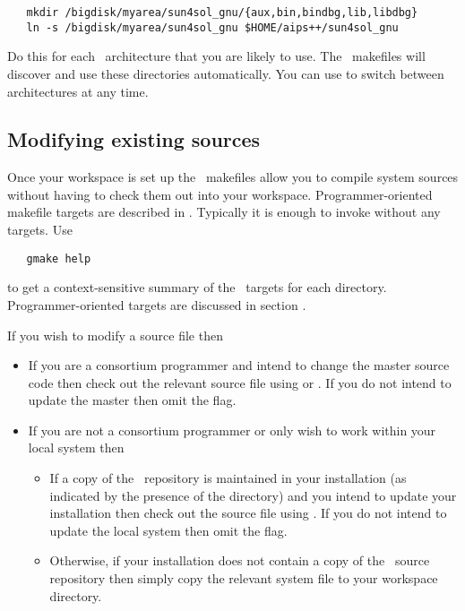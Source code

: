 \begin{verbatim}
   mkdir /bigdisk/myarea/sun4sol_gnu/{aux,bin,bindbg,lib,libdbg}
   ln -s /bigdisk/myarea/sun4sol_gnu $HOME/aips++/sun4sol_gnu
\end{verbatim}

\noindent
Do this for each \aipspp\ architecture that you are likely to use.  The
\aipspp\ makefiles will discover and use these directories automatically.  You
can use  to switch between architectures at any time.

\subsection*{Modifying existing sources}

Once your workspace is set up the \aipspp\ makefiles allow you to compile
system sources without having to check them out into your workspace.
Programmer-oriented makefile targets are described in .  Typically it is enough to invoke  without
any targets.  Use

\begin{verbatim}
   gmake help
\end{verbatim}

\noindent
to get a context-sensitive summary of the \aipspp\ targets for each directory.
Programmer-oriented targets are discussed in section .

If you wish to modify a source file then

\begin{itemize}
\item
   If you are a consortium programmer and intend to change the master source
   code then check out the relevant source file using  or
   .  If you do not intend to update the master then
   omit the  flag.

\item
   If you are not a consortium programmer or only wish to work within your
   local system then
   \begin{itemize}
   \item
      If a copy of the \rcs\ repository is maintained in your installation (as
      indicated by the presence of the  directory) and
      you intend to update your installation then check out the source file
      using .  If you do not intend to update the local system
      then omit the  flag.

   \item
      Otherwise, if your installation does not contain a copy of the \rcs\
      source repository then simply copy the relevant system file to your
      workspace directory.
   \end{itemize}
\end{itemize}

